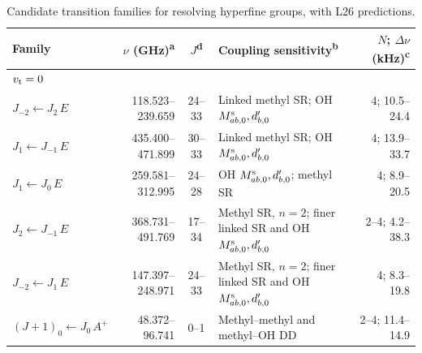 \begin{table}[!tp]
\caption{Candidate transition families for resolving
hyperfine groups, with L26 predictions.}
\label{tab:experiment-families}
\centering
\begingroup
\small
\setlength{\tabcolsep}{3pt}
\renewcommand{\arraystretch}{1.16}
\begin{ruledtabular}
\begin{tabular}{lrc lr}
Family & $\nu$ (GHz)\textsuperscript{a} & $J$\textsuperscript{d} & Coupling sensitivity\textsuperscript{b} & $N$; $\Delta\nu$ (kHz)\textsuperscript{c}\\
\hline
\multicolumn{5}{l}{$v_{\rm t}=0$}\\
$J_{-2}\leftarrow J_2\,E$\hspace{0.6em} & 118.523--239.659 & 24--33 & \shortstack[l]{Linked methyl SR;\\OH $M^{\rm s}_{ab,0},d^{\prime}_{b,0}$} & 4; 10.5--24.4 \\[3pt]
$J_1\leftarrow J_{-1}\,E$\hspace{0.6em} & 435.400--471.899 & 30--33 & \shortstack[l]{Linked methyl SR;\\OH $M^{\rm s}_{ab,0},d^{\prime}_{b,0}$} & 4; 13.9--33.7 \\[3pt]
$J_1\leftarrow J_0\,E$\hspace{0.6em} & 259.581--312.995 & 24--28 & \shortstack[l]{OH $M^{\rm s}_{ab,0},d^{\prime}_{b,0}$;\\methyl SR} & 4; 8.9--20.5 \\[3pt]
$J_2\leftarrow J_{-1}\,E$\hspace{0.6em} & 368.731--491.769 & 17--34 & \shortstack[l]{Methyl SR, $n=2$; finer linked\\SR and OH $M^{\rm s}_{ab,0},d^{\prime}_{b,0}$} & 2--4; 4.2--38.3 \\[3pt]
$J_{-2}\leftarrow J_1\,E$\hspace{0.6em} & 147.397--248.971 & 24--33 & \shortstack[l]{Methyl SR, $n=2$; finer linked\\SR and OH $M^{\rm s}_{ab,0},d^{\prime}_{b,0}$} & 4; 8.3--19.8 \\[3pt]
$(J+1)_0\leftarrow J_0\,A^+$\hspace{0.6em} & 48.372--96.741 & 0--1 & \shortstack[l]{Methyl--methyl and\\methyl--OH DD} & 2--4; 11.4--14.9 \\[3pt]

\end{tabular}
\end{ruledtabular}
\end{table}
